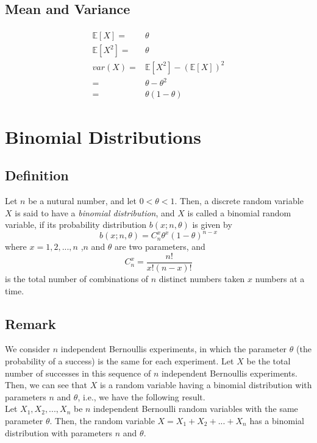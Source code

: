 \documentclass[titlepage]{article}
\begin{document}
        \subsection*{Mean and Variance}
            \paragraph{
                \begin{equation*}
                    \begin{split}
                        \mathbb{E}[X]=&\theta\\
                        \mathbb{E}[X^2]=&\theta\\
                        var(X)=&\mathbb{E}[X^2]-(\mathbb{E}[X])^2\\
                        =&\theta-\theta^2\\
                        =&\theta(1-\theta)
                    \end{split}
                \end{equation*}
            }
    \section{Binomial Distributions}
        \subsection*{Definition}
            Let $n$ be a nutural number, and let $0<\theta<1$. Then, a discrete random variable $X$ is said to have a \textit{binomial distribution}, and $X$ is called a binomial random variable, if its probability distribution $b(x;n,\theta)$ is given by
            $$b(x;n,\theta)=C_n^x\theta^x(1-\theta)^{n-x}$$
            where $x=1,2,...,n$ ,$n$ and $\theta$ are two parameters, and 
            $$C_n^x=\frac{n!}{x!(n-x)!}$$
            is the total number of combinations of $n$ distinct numbers taken $x$ numbers at a time.
        \subsection*{Remark}
        We consider $n$ independent Bernoullis experiments, in
        which the parameter $\theta$ (the probability of a success) is the same
        for each experiment. Let $X$ be the total number of successes in
        this sequence of $n$ independent Bernoullis experiments. Then, we
        can see that $X$ is a random variable having a binomial distribution
        with parameters $n$ and $\theta$, i.e., we have the following result.
        \\
        Let $X_1,X_2,...,X_n$ be $n$ independent Bernoulli random variables with the same parameter $\theta$. Then, the random variable $X=X_1+X_2+...+X_n$ has a binomial distribution with parameters $n$ and $\theta$.
\end{document}
